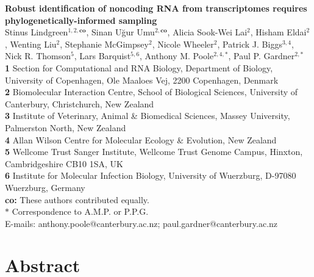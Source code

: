 \documentclass[10pt]{article}
\date{}
\begin{document}
\begin{flushleft}
{\Large
\textbf{Robust identification of noncoding RNA from transcriptomes requires phylogenetically-informed sampling}
}
\\
Stinus Lindgreen$^{1,2,\mathbf{co}}$, 
Sinan U\u{g}ur Umu$^{2,\mathbf{co}}$, 
Alicia Sook-Wei Lai$^{2}$,
Hisham Eldai$^{2}$,
Wenting Liu$^{2}$,
Stephanie McGimpsey$^{2}$,
Nicole Wheeler$^{2}$,
Patrick J. Biggs$^{3,4}$,
Nick R. Thomson$^{5}$,
Lars Barquist$^{5,6}$,
Anthony M. Poole$^{2,4,\ast}$,
Paul P. Gardner$^{2,\ast}$
\\
{\bf 1} Section for Computational and RNA Biology, Department of Biology, University of Copenhagen, Ole Maaloes Vej, 2200 Copenhagen, Denmark
\\
{\bf 2} Biomolecular Interaction Centre, School of Biological Sciences, University of Canterbury, Christchurch, New Zealand
\\
{\bf 3} Institute of Veterinary, Animal \& Biomedical Sciences, Massey University, Palmerston North, New Zealand
\\
{\bf 4} Allan Wilson Centre for Molecular Ecology \& Evolution, New Zealand
\\
{\bf 5} Wellcome Trust Sanger Institute, Wellcome Trust Genome Campus, Hinxton, Cambridgeshire CB10 1SA, UK
\\
{\bf 6} Institute for Molecular Infection Biology, University of Wuerzburg, D-97080 Wuerzburg, Germany
\\
{\bf co:} These authors contributed equally.
\\
$\ast$ Correspondence to A.M.P. or P.P.G.\\ 
E-mails: anthony.poole@canterbury.ac.nz; paul.gardner@canterbury.ac.nz
\end{flushleft}

\section*{Abstract}
\end{document}
